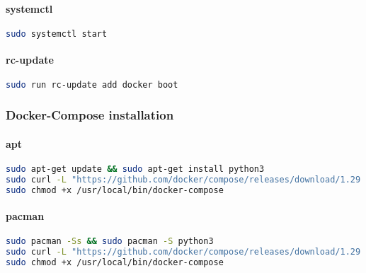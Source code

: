 \paragraph{systemctl}

\begin{flushleft}
\begin{lstlisting}[language=bash,label={lst:systemctl-docker}]
sudo systemctl start
\end{lstlisting}
\end{flushleft}

\paragraph{rc-update}
\begin{flushleft}
\begin{lstlisting}[language=bash,label={lst:rc-docker}]
sudo run rc-update add docker boot
\end{lstlisting}
\end{flushleft}

\subsubsection{Docker-Compose installation}
\paragraph{apt}
\begin{flushleft}
\begin{lstlisting}[language=bash,label={lst:apt-compose}]
sudo apt-get update && sudo apt-get install python3
sudo curl -L "https://github.com/docker/compose/releases/download/1.29.2/docker-compose-$(uname -s)-$(uname -m)" -o /usr/local/bin/docker-compose
sudo chmod +x /usr/local/bin/docker-compose
\end{lstlisting}
\end{flushleft}

\paragraph{pacman}
\begin{flushleft}
\begin{lstlisting}[language=bash,label={lst:pacman-compose}]
sudo pacman -Ss && sudo pacman -S python3
sudo curl -L "https://github.com/docker/compose/releases/download/1.29.2/docker-compose-$(uname -s)-$(uname -m)" -o /usr/local/bin/docker-compose
sudo chmod +x /usr/local/bin/docker-compose
\end{lstlisting}
\end{flushleft}

